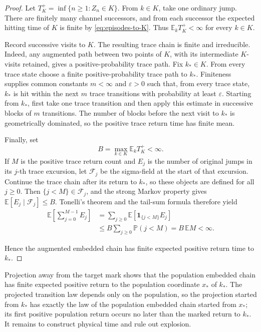 \begin{proof}
Let \(T_K^+=\inf\{n\ge1:Z_n\in K\}\).  From \(k\in K\), take one ordinary
jump.  There are finitely many channel successors, and from each successor
the expected hitting time of \(K\) is finite by \eqref{eq:episodes-to-K}.
Thus \(\mathbb E_kT_K^+<\infty\) for every \(k\in K\).

Record successive visits to \(K\).  The resulting trace chain is finite and
irreducible.  Indeed, any augmented path between two points of \(K\), with
its intermediate \(K\)-visits retained, gives a positive-probability trace
path.  Fix \(k_*\in K\).  From every trace state choose a finite
positive-probability trace path to \(k_*\).  Finiteness supplies common
constants \(m<\infty\) and \(\varepsilon>0\) such that, from every trace
state, \(k_*\) is hit within the next \(m\) trace transitions with probability
at least \(\varepsilon\).  Starting from \(k_*\), first take one trace
transition and then apply this estimate in successive blocks of \(m\)
transitions.  The number of blocks before the next visit to \(k_*\) is
geometrically dominated, so the positive trace return time has finite mean.

Finally, set
\[
  B=\max_{k\in K}\mathbb E_kT_K^+<\infty.
\]
If \(M\) is the positive trace return count and \(E_j\) is the number of
original jumps in its \(j\)-th trace excursion, let \(\mathcal F_j\) be the
sigma-field at the start of that excursion.  Continue the trace chain after
its return to \(k_*\), so these objects are defined for all \(j\ge0\).  Then
\(\{j<M\}\in\mathcal F_j\), and the strong Markov property gives
\(\mathbb E[E_j\mid\mathcal F_j]\le B\).  Tonelli's theorem and the tail-sum
formula therefore yield
\[
\begin{aligned}
  \mathbb E\!\left[\sum_{j=0}^{M-1}E_j\right]
  &=\sum_{j\ge0}\mathbb E\!\left[
      \mathbf1_{\{j<M\}}E_j\right]\\
  &\le B\sum_{j\ge0}\mathbb P(j<M)
   =B\,\mathbb E M<\infty.
\end{aligned}
\]

\noindent
Hence the augmented embedded chain has finite expected positive return time
to \(k_*\).
\end{proof}

Projection away from the target mark shows that the population embedded chain
has finite expected positive return to the population coordinate \(x_*\) of
\(k_*\).  The projected transition law depends only on the population, so the
projection started from \(k_*\) has exactly the law of the population embedded
chain started from \(x_*\); its first positive population return occurs no
later than the marked return to \(k_*\).
It remains to construct physical time and rule out explosion.

